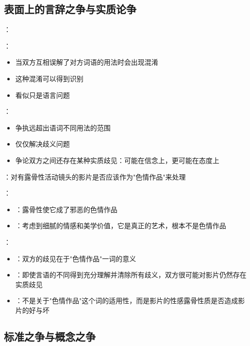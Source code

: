 \subsection{表面上的言辞之争与实质论争}

\begin{theorembox}[title=第三种论争的定义与特征]
：

：
\begin{itemize}
  \item 当双方互相误解了对方词语的用法时会出现混淆
  \item 这种混淆可以得到识别
  \item 看似只是语言问题
\end{itemize}

：
\begin{itemize}
  \item 争执远超出语词不同用法的范围
  \item 仅仅解决歧义问题
  \item 争论双方之间还存在某种实质歧见：可能在信念上，更可能在态度上
\end{itemize}
\end{theorembox}

\begin{examplebox}[title=色情作品争议的案例分析]
：对有露骨性活动镜头的影片是否应该作为"色情作品"来处理

：
\begin{itemize}
  \item {}：露骨性使它成了邪恶的色情作品
  \item {}：考虑到细腻的情感和美学价值，它是真正的艺术，根本不是色情作品
\end{itemize}

：
\begin{itemize}
  \item {}：双方的歧见在于"色情作品"一词的意义
  \item {}：即使言语的不同得到充分理解并清除所有歧义，双方很可能对影片仍然存在实质歧见
  \item {}：不是关于"色情作品"这个词的适用性，而是影片的性感露骨性质是否造成影片的好与坏
\end{itemize}
\end{examplebox}

\subsection{标准之争与概念之争}

